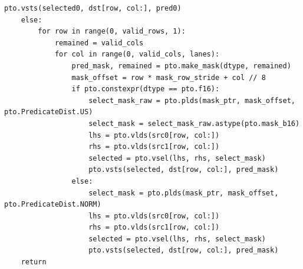 \begin{lstlisting}[style=ptocode]
                pto.vsts(selected0, dst[row, col:], pred0)
    else:
        for row in range(0, valid_rows, 1):
            remained = valid_cols
            for col in range(0, valid_cols, lanes):
                pred_mask, remained = pto.make_mask(dtype, remained)
                mask_offset = row * mask_row_stride + col // 8
                if pto.constexpr(dtype == pto.f16):
                    select_mask_raw = pto.plds(mask_ptr, mask_offset, pto.PredicateDist.US)
                    select_mask = select_mask_raw.astype(pto.mask_b16)
                    lhs = pto.vlds(src0[row, col:])
                    rhs = pto.vlds(src1[row, col:])
                    selected = pto.vsel(lhs, rhs, select_mask)
                    pto.vsts(selected, dst[row, col:], pred_mask)
                else:
                    select_mask = pto.plds(mask_ptr, mask_offset, pto.PredicateDist.NORM)
                    lhs = pto.vlds(src0[row, col:])
                    rhs = pto.vlds(src1[row, col:])
                    selected = pto.vsel(lhs, rhs, select_mask)
                    pto.vsts(selected, dst[row, col:], pred_mask)
    return
\end{lstlisting}
\Needspace{0.34\textheight}
